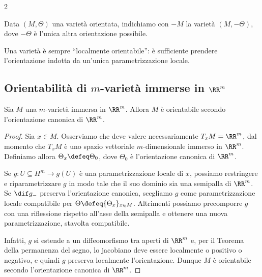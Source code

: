 \begin{multicols*}{2}
    \begin{definition}
        Data $(M, \Theta)$ una varietà orientata, indichiamo con $-M$ la varietà
        $(M, -\Theta)$, dove $-\Theta$ è l'unica altra orientazione possibile.
    \end{definition}

    \begin{remark}
        Una varietà è sempre ``localmente orientabile'': è sufficiente
        prendere l'orientazione indotta da un'unica parametrizzazione locale.
    \end{remark}

    \subsection{Orientabilità di \texorpdfstring{$m$}{m}-varietà immerse in \texorpdfstring{$\RR^m$}{ℝᵐ}}

    \begin{proposition} \label{prop:orientazione_immersa_Rm}
        Sia $M$ una $m$-varietà immersa in $\RR^m$. Allora
        $M$ è orientabile secondo l'orientazione canonica di $\RR^m$.
    \end{proposition}

    \begin{proof}
        Sia $x \in M$. Osserviamo
        che deve valere necessariamente $T_x M = \RR^m$, dal momento che
        $T_x M$ è uno spazio vettoriale $m$-dimensionale immerso in $\RR^m$.
        Definiamo allora $\Theta_x \defeq \Theta_0$,
        dove $\Theta_0$ è l'orientazione canonica di $\RR^m$. \smallskip

        Se $g : U \subseteq H^m \to g(U)$ è una parametrizzazione locale di $x$, possiamo restringere e
        riparametrizzare $g$
        in modo tale che il suo dominio sia una semipalla di $\RR^m$. Se $\dif g_{-}$ preserva
        l'orientazione canonica, scegliamo $g$ come parametrizzazione locale compatibile
        per $\Theta \defeq \{\Theta_x\}_{x \in M}$. Altrimenti possiamo precomporre $g$
        con una riflessione rispetto all'asse della semipalla e ottenere una nuova parametrizzazione,
        stavolta compatibile. \smallskip

        Infatti, $g$ si estende a un diffeomorfismo tra aperti di $\RR^m$ e,
        per il Teorema della permanenza del segno, lo jacobiano deve essere localmente o positivo
        o negativo, e quindi $g$ preserva localmente l'orientazione.
        Dunque $M$ è orientabile secondo l'orientazione canonica di $\RR^m$.
    \end{proof}


\end{multicols*}

